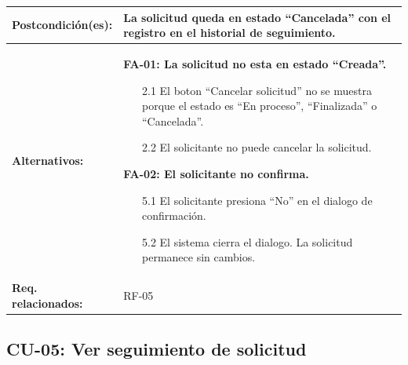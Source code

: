 \begin{longtable}{|L{4cm}|L{9.5cm}|}
    \hline
    \textbf{Postcondición(es):} & La solicitud queda en estado ``Cancelada'' con el registro en el historial de seguimiento. \\
    \hline
    \textbf{Alternativos:} &
    \textbf{FA-01: La solicitud no esta en estado ``Creada''.}
    \begin{enumerate}[nosep, leftmargin=*]
        \item[2.1] El boton ``Cancelar solicitud'' no se muestra porque el estado es ``En proceso'', ``Finalizada'' o ``Cancelada''.
        \item[2.2] El solicitante no puede cancelar la solicitud.
    \end{enumerate}
    \vspace{0.2cm}
    \textbf{FA-02: El solicitante no confirma.}
    \begin{enumerate}[nosep, leftmargin=*]
        \item[5.1] El solicitante presiona ``No'' en el dialogo de confirmación.
        \item[5.2] El sistema cierra el dialogo. La solicitud permanece sin cambios.
    \end{enumerate} \\
    \hline
    \textbf{Req. relacionados:} & RF-05 \\
    \hline
\end{longtable}

\subsection{CU-05: Ver seguimiento de solicitud}

